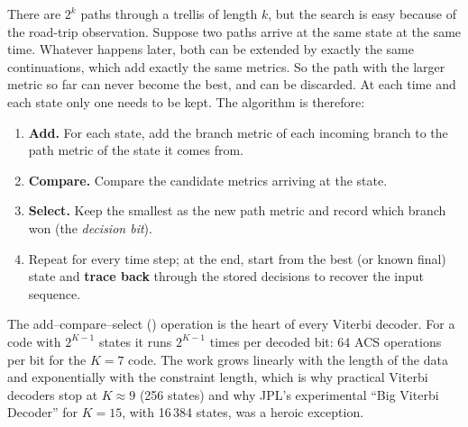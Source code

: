 There are $2^{k}$ paths through a trellis of length $k$, but the search is easy because of the road-trip
observation. Suppose two paths arrive at the same state at the same time. Whatever happens later,
both can be extended by exactly the same continuations, which add exactly the same metrics. So the path
with the larger metric so far can never become the best, and can be discarded. At each time and each
state only one  needs to be kept. The algorithm is therefore:
\begin{enumerate}
\item \textbf{Add.} For each state, add the branch metric of each incoming branch to the path metric of
the state it comes from.
\item \textbf{Compare.} Compare the candidate metrics arriving at the state.
\item \textbf{Select.} Keep the smallest as the new path metric and record which branch won (the
\emph{decision bit}).
\item Repeat for every time step; at the end, start from the best (or known final) state and
\textbf{trace back} through the stored decisions to recover the input sequence.
\end{enumerate}
The add--compare--select () operation is the heart of every Viterbi decoder. For a code with
$2^{K-1}$ states it runs $2^{K-1}$ times per decoded bit: 64 ACS operations per bit for the $K=7$ code.
The work grows linearly with the length of the data and exponentially with the constraint length, which
is why practical Viterbi decoders stop at $K\approx9$ (256 states) and why JPL's experimental ``Big
Viterbi Decoder'' for $K=15$, with 16\,384 states, was a heroic exception.

